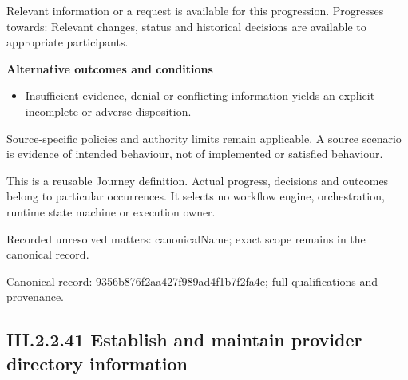 Relevant information or a request is available for this progression. Progresses towards: Relevant changes, status and historical decisions are available to appropriate participants.



\par\medskip\textbf{Alternative outcomes and conditions}\par


\begin{itemize}


\item Insufficient evidence, denial or conflicting information yields an explicit incomplete or adverse disposition.

\end{itemize}


Source-specific policies and authority limits remain applicable. A source scenario is evidence of intended behaviour, not of implemented or satisfied behaviour.



This is a reusable Journey definition. Actual progress, decisions and outcomes belong to particular occurrences. It selects no workflow engine, orchestration, runtime state machine or execution owner.


{\small Recorded unresolved matters: canonicalName; exact scope remains in the canonical record.}\par
{\footnotesize \href{../../../../continuum/strategy/value-stream/9356b876f2aa427f989ad4f1b7f2fa4c.md}{Canonical record: 9356b876f2aa427f989ad4f1b7f2fa4c}; full qualifications and provenance.}\par
\subsection*{III.2.2.41 Establish and maintain provider directory information}
\label{navigation:III.2.2.41}

